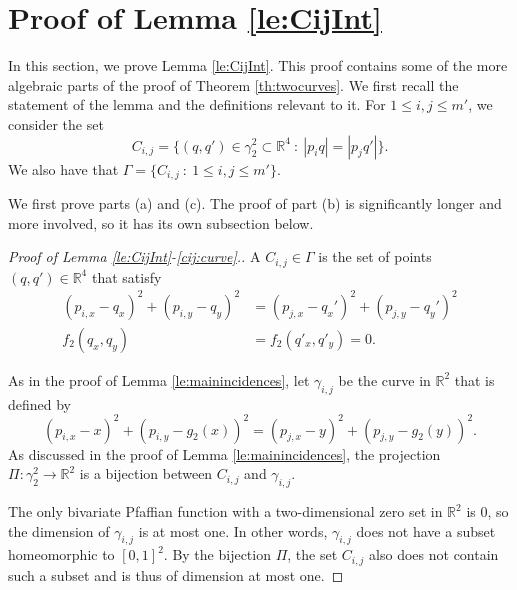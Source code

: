 \documentclass[11pt]{article}
\theoremstyle{definition}
\newcommand{\RR}{\mathbb R}
\newcommand{\curves}{\Gamma}
\begin{document}
\section{Proof of Lemma \ref{le:CijInt}} \label{sec:LemmaCij}

In this section, we prove Lemma \ref{le:CijInt}.
This proof contains some of the more algebraic parts of the proof of Theorem \ref{th:twocurves}.
We first recall the statement of the lemma and the definitions relevant to it.
For $1\le i,j\le m'$, we consider the set \begin{equation*}  
C_{i,j} = \{(q,q')\in \gamma_2^2 \subset\RR^4\ :\ |p_i q| = |p_jq'| \}. 
\end{equation*}
%
We also have that $\curves = \{ C_{i,j}\ :\ 1\leq i,j \leq m' \}$.
\vspace{2mm}


We first prove parts (a) and (c).
The proof of part (b) is significantly longer and more involved, so it has its own subsection below.

\begin{proof}[Proof of Lemma \ref{le:CijInt}-\ref{cij:curve}.]
A $C_{i,j}\in \curves$ is the set of points $(q,q')\in \RR^4$ that satisfy  
\begin{align*}
(p_{i,x}-q_x )^2+(p_{i,y}-q_y )^2 &= (p_{j,x}-q_x')^2+(p_{j,y}-q_y')^2 \\[2mm]
f_2(q_x,q_y)&=f_2(q'_x,q'_y)=0.
\end{align*}

As in the proof of Lemma \ref{le:mainincidences}, let $\gamma_{i,j}$ be the curve in $\RR^2$ that is defined by
%
\[ (p_{i,x}-x)^2+(p_{i,y}-g_2(x))^2=(p_{j,x}-y)^2+(p_{j,y}-g_2(y))^2. \]
%
As discussed in the proof of Lemma \ref{le:mainincidences}, the projection $\Pi: \gamma_2^2 \to \RR^2$ is a bijection between $C_{i,j}$ and $\gamma_{i,j}$.

The only bivariate Pfaffian function with a two-dimensional zero set in $\RR^2$ is 0, so the dimension of $\gamma_{i,j}$ is at most one. 
In other words, $\gamma_{i,j}$ does not have a subset homeomorphic to $[0,1]^2$.
By the bijection $\Pi$, the set $C_{i,j}$ also does not contain such a subset and is thus of dimension at most one. 
%
\end{proof}
\end{document}
